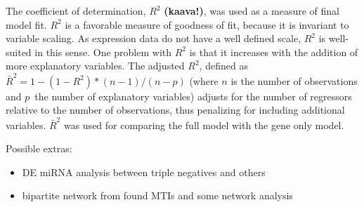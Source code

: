 The coefficient of determination, $R^2$ \textbf{(kaava!)}, was used as a measure of final model
fit. $R^2$ is a favorable measure of goodness of fit, because it is invariant
to variable scaling. As expression data do not have a well defined scale,
$R^2$ is well-suited in this sense. One problem with $R^2$ is that it
increases with the addition of more explanatory variables. The adjusted $R^2$,
defined as $\bar{R}^2 = 1-(1-R^2)*(n-1)/(n-p)$ (where $n$ is the number of
observations and $p$ the number of explanatory variables) adjusts for the
number of regressors relative to the number of observations, thus penalizing
for including additional variables. $\bar{R}^2$ was used for comparing the
full model with the gene only model.

Possible extras:
\begin{itemize}
	\item DE miRNA analysis between triple negatives and others
	\item bipartite network from found MTIs and some network analysis
\end{itemize}
